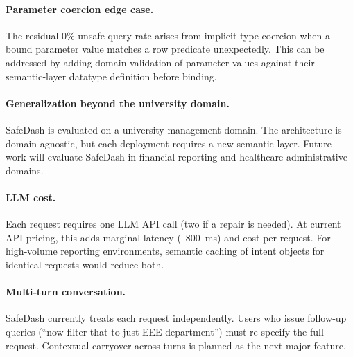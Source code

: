 \documentclass[11pt]{article}
\begin{document}
\paragraph{Parameter coercion edge case.} The residual 0\% unsafe query rate arises from implicit type coercion when a bound parameter value matches a row predicate unexpectedly. This can be addressed by adding domain validation of parameter values against their semantic‑layer datatype definition before binding.

\paragraph{Generalization beyond the university domain.} SafeDash is evaluated on a university management domain. The architecture is domain‑agnostic, but each deployment requires a new semantic layer. Future work will evaluate SafeDash in financial reporting and healthcare administrative domains.

\paragraph{LLM cost.} Each request requires one LLM API call (two if a repair is needed). At current API pricing, this adds marginal latency (~800 ms) and cost per request. For high‑volume reporting environments, semantic caching of intent objects for identical requests would reduce both.

\paragraph{Multi‑turn conversation.} SafeDash currently treats each request independently. Users who issue follow‑up queries (``now filter that to just EEE department'') must re‑specify the full request. Contextual carryover across turns is planned as the next major feature.
\end{document}
